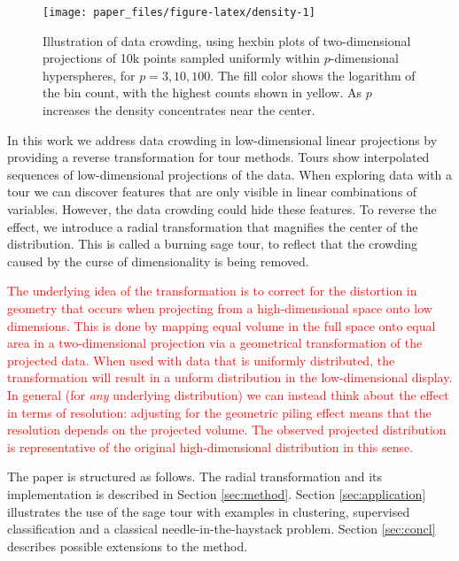 \documentclass[]{interact}
\theoremstyle{plain}%
\theoremstyle{definition}
\theoremstyle{remark}
\begin{document}
\begin{figure}

{\centering \texttt{[image: paper\_files/figure-latex/density-1]} 

}

\caption{Illustration of data crowding, using hexbin plots of two-dimensional projections of 10k points sampled uniformly within $p$-dimensional hyperspheres, for $p=3, 10, 100$. The fill color shows the logarithm of the bin count, with the highest counts shown in yellow. As $p$ increases the density  concentrates near the center.}\label{fig:density}
\end{figure}

In this work we address data crowding in low-dimensional linear
projections by providing a reverse transformation for tour methods.
Tours show interpolated sequences of low-dimensional projections of the
data. When exploring data with a tour we can discover features that are
only visible in linear combinations of variables. However, the data
crowding could hide these features. To reverse the effect, we introduce
a radial transformation that magnifies the center of the distribution.
This is called a burning sage tour, to reflect that the crowding caused
by the curse of dimensionality is being removed.

\textcolor{red}{The underlying idea of the transformation is to correct for the distortion in geometry that occurs when projecting from a high-dimensional space onto low dimensions. This is done by mapping equal volume in the full space onto equal area in a two-dimensional projection via a geometrical transformation of the projected data. When used with data that is uniformly distributed, the transformation will result in a unform distribution in the low-dimensional display. In general (for \textit{any} underlying distribution) we can instead think about the effect in terms of resolution: adjusting for the geometric piling effect means that the resolution depends on the projected volume. The observed projected distribution is representative of the original high-dimensional distribution in this sense.}

The paper is structured as follows. The radial transformation and its
implementation is described in Section \ref{sec:method}. Section
\ref{sec:application} illustrates the use of the sage tour with examples
in clustering, supervised classification and a classical
needle-in-the-haystack problem. Section \ref{sec:concl} describes
possible extensions to the method.
\end{document}

